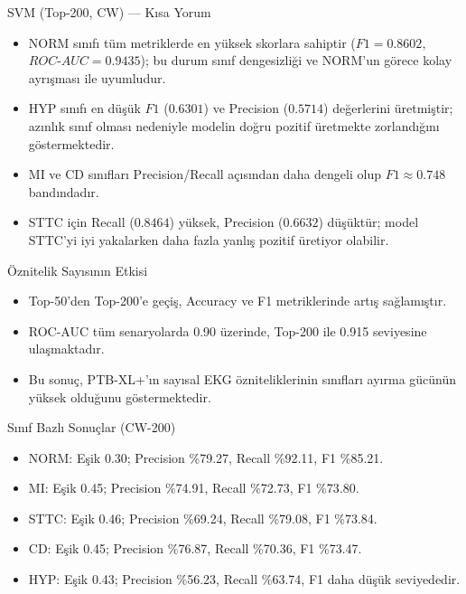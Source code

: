 \documentclass[aspectratio=169]{beamer}
\def\textbf#1{#1}%
\begin{document}
\begin{frame}{SVM (Top-200, CW) — Kısa Yorum}
	\small
	\begin{itemize}
		\item \textbf{NORM} sınıfı tüm metriklerde en yüksek skorlara sahiptir (\(F1=0.8602\), \(ROC\text{-}AUC=0.9435\)); bu durum sınıf dengesizliği ve NORM’un görece kolay ayrışması ile uyumludur.
		\item \textbf{HYP} sınıfı en düşük \(F1\) (\(0.6301\)) ve \textbf{Precision} (\(0.5714\)) değerlerini üretmiştir; azınlık sınıf olması nedeniyle modelin doğru pozitif üretmekte zorlandığını göstermektedir.
		\item \textbf{MI} ve \textbf{CD} sınıfları Precision/Recall açısından daha dengeli olup \(F1 \approx 0.748\) bandındadır.
		\item \textbf{STTC} için \textbf{Recall} (\(0.8464\)) yüksek, \textbf{Precision} (\(0.6632\)) düşüktür; model STTC’yi iyi yakalarken daha fazla yanlış pozitif üretiyor olabilir.
	\end{itemize}
\end{frame}

\begin{frame}{Öznitelik Sayısının Etkisi}
	\begin{itemize}
		\item Top-50'den Top-200'e geçiş, Accuracy ve F1 metriklerinde artış sağlamıştır.
		\item ROC-AUC tüm senaryolarda 0.90 üzerinde, Top-200 ile 0.915 seviyesine ulaşmaktadır.
		\item Bu sonuç, PTB-XL+'ın sayısal EKG özniteliklerinin sınıfları ayırma gücünün yüksek olduğunu göstermektedir.
	\end{itemize}
\end{frame}

\begin{frame}{Sınıf Bazlı Sonuçlar (CW-200)}
	\begin{itemize}
		\item NORM: Eşik 0.30; Precision \%79.27, Recall \%92.11, F1 \%85.21.
		\item MI: Eşik 0.45; Precision \%74.91, Recall \%72.73, F1 \%73.80.
		\item STTC: Eşik 0.46; Precision \%69.24, Recall \%79.08, F1 \%73.84.
		\item CD: Eşik 0.45; Precision \%76.87, Recall \%70.36, F1 \%73.47.
		\item HYP: Eşik 0.43; Precision \%56.23, Recall \%63.74, F1 daha düşük seviyededir.
	\end{itemize}
\end{frame}
\end{document}
